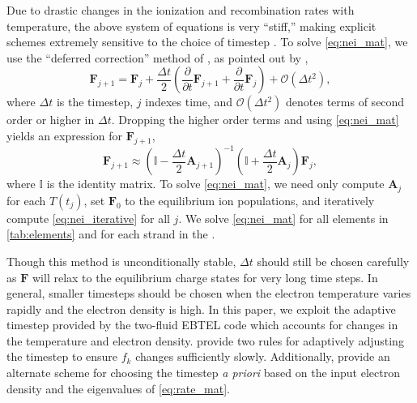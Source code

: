 Due to drastic changes in the ionization and recombination rates with temperature, the above system of equations is very ``stiff,'' making explicit schemes extremely sensitive to the choice of timestep \citep{macneice_numerical_1984,bradshaw_numerical_2009}. To solve \autoref{eq:nei_mat}, we use the ``deferred correction'' method of \citet{npl_modern_1961}, as pointed out by \citet{macneice_numerical_1984},
\begin{equation*}
    \mathbf{F}_{j+1} = \mathbf{F}_j + \frac{\Delta t}{2}\left(\frac{\partial}{\partial t}\mathbf{F}_{j+1} + \frac{\partial}{\partial t}\mathbf{F}_j\right) + \mathcal{O}(\Delta t^2),
\end{equation*}
where $\Delta t$ is the timestep, $j$ indexes time, and $\mathcal{O}(\Delta t^2)$ denotes terms of second order or higher in $\Delta t$. Dropping the higher order terms and using \autoref{eq:nei_mat} yields an expression for $\mathbf{F}_{j+1}$,
\begin{equation}\label{eq:nei_iterative}
    \mathbf{F}_{j+1} \approx \left(\mathbb{I} - \frac{\Delta t}{2}\mathbf{A}_{j+1}\right)^{-1}\left(\mathbb{I} + \frac{\Delta t}{2}\mathbf{A}_{j}\right)\mathbf{F}_j,
\end{equation}
where $\mathbb{I}$ is the identity matrix. To solve \autoref{eq:nei_mat}, we need only compute $\mathbf{A}_j$ for each $T(t_j)$, set $\mathbf{F}_0$ to the equilibrium ion populations, and iteratively compute \autoref{eq:nei_iterative} for all $j$. We solve \autoref{eq:nei_mat} for all elements in \autoref{tab:elements} and for each strand in the \AR{}.

Though this method is unconditionally stable, $\Delta t$ should still be chosen carefully as $\mathbf{F}$ will relax to the equilibrium charge states for very long time steps. In general, smaller timesteps should be chosen when the electron temperature varies rapidly and the electron density is high. In this paper, we exploit the adaptive timestep provided by the two-fluid EBTEL code which accounts for changes in the temperature and electron density. \citet{macneice_numerical_1984} provide two rules for adaptively adjusting the timestep to ensure $f_k$ changes sufficiently slowly. Additionally, \citet{shen_lagrangian_2015} provide an alternate scheme for choosing the timestep \textit{a priori} based on the input electron density and the eigenvalues of \autoref{eq:rate_mat}.

